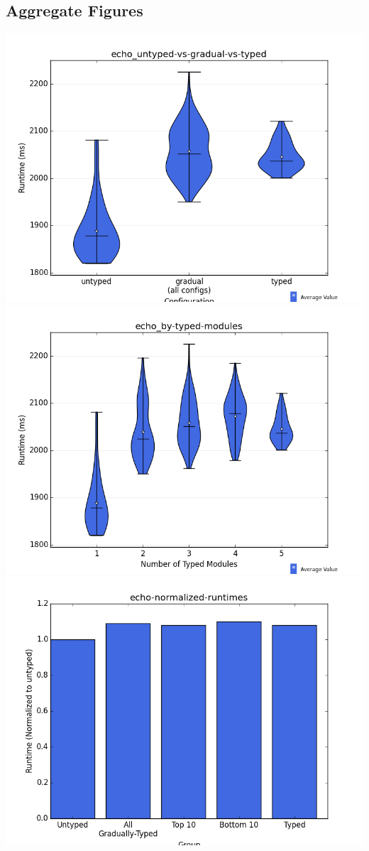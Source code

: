 \documentclass{article}
\begin{document}
\subsection{Aggregate Figures}
\includegraphics[width=\textwidth]{echo_untyped-vs-gradual-vs-typed-violin.png}
\includegraphics[width=\textwidth]{echo_by-typed-modules-violin.png}
\includegraphics[width=\textwidth]{echo-normalized-runtimes-bar.png}
\end{document}
